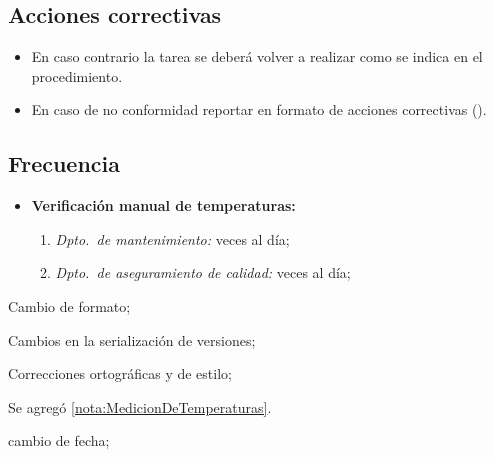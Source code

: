 \subsection{Acciones correctivas}

\begin{itemize}
	\item En caso contrario la tarea se deberá volver a realizar como se indica en el procedimiento.
	\item En caso de no conformidad reportar en formato de acciones correctivas (\IdFormAACC).
\end{itemize}

\subsection{Frecuencia}

\begin{itemize}
	\item \textbf{Verificación manual de temperaturas:}
		\begin{enumerate}
			\item \emph{Dpto.\ de mantenimiento:} \VecesTempManual veces al día;
			\item \emph{Dpto.\ de aseguramiento de calidad:} \VecesTempManual veces al día;
		\end{enumerate}
\end{itemize}

\begin{changelog}[simple, sectioncmd=\subsection*,label=changelog-2.3]

	\begin{version}[v=2.1, date=2023--01, author=Pablo E. Alanis]
		\item Cambio de formato;
		\item Cambios en la serialización de versiones;
		\item Correcciones ortográficas y de estilo;
		\item Se agregó \cref{nota:MedicionDeTemperaturas}.
	\end{version}

	\begin{version}[v=1.8, date=2022--05, author=Alonso M.]
		\item cambio de fecha;
	\end{version}

\end{changelog}